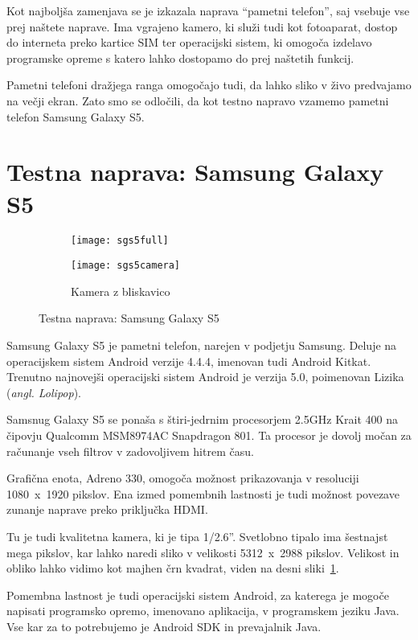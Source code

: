 Kot najboljša zamenjava se je izkazala naprava ``pametni telefon'', saj
vsebuje vse prej naštete naprave. Ima vgrajeno kamero, ki služi tudi kot
fotoaparat, dostop do interneta preko kartice SIM ter operacijski sistem, ki
omogoča izdelavo programske opreme s katero lahko dostopamo do prej naštetih
funkcij.

Pametni telefoni dražjega ranga omogočajo tudi, da lahko sliko v živo
predvajamo na večji ekran. Zato smo se odločili, da kot testno napravo vzamemo
pametni telefon Samsung Galaxy S5.

\section{Testna naprava: Samsung Galaxy S5}

\begin{figure}[!ht]
    \centering
    \begin{subfigure}[b]{0.4\textwidth}
        \texttt{[image: sgs5full]}
    \end{subfigure}
    \begin{subfigure}[b]{0.4\textwidth}
        \texttt{[image: sgs5camera]}
        \caption{Kamera z bliskavico}
    \end{subfigure}
    \caption{Testna naprava: Samsung Galaxy S5}
    \label{fig:sgs5}
\end{figure}

Samsung Galaxy S5 je pametni telefon, narejen v podjetju Samsung. Deluje na
operacijskem sistem Android verzije 4.4.4, imenovan tudi Android Kitkat.
Trenutno najnovejši operacijski sistem Android je verzija 5.0, poimenovan
Lizika (\textit{angl. Lolipop}).

Samsnug Galaxy S5 se ponaša s štiri-jedrnim procesorjem 2.5GHz Krait 400 na
čipovju Qualcomm MSM8974AC Snapdragon 801. Ta procesor je dovolj močan za
računanje vseh filtrov v zadovoljivem hitrem času.

Grafična enota, Adreno 330, omogoča možnost prikazovanja v resoluciji
1080~x~1920 pikslov. Ena izmed pomembnih lastnosti je tudi možnost povezave
zunanje naprave preko priključka HDMI.

Tu je tudi kvalitetna kamera, ki je tipa 1/2.6''. Svetlobno tipalo ima
šestnajst mega pikslov, kar lahko naredi sliko v velikosti 5312~x~2988
pikslov. Velikost in obliko lahko vidimo kot majhen črn kvadrat, viden na
desni sliki~\ref{fig:sgs5}.

Pomembna lastnost je tudi operacijski sistem Android, za katerega je mogoče
napisati programsko opremo, imenovano aplikacija, v programskem jeziku Java.
Vse kar za to potrebujemo je Android SDK in prevajalnik Java.


